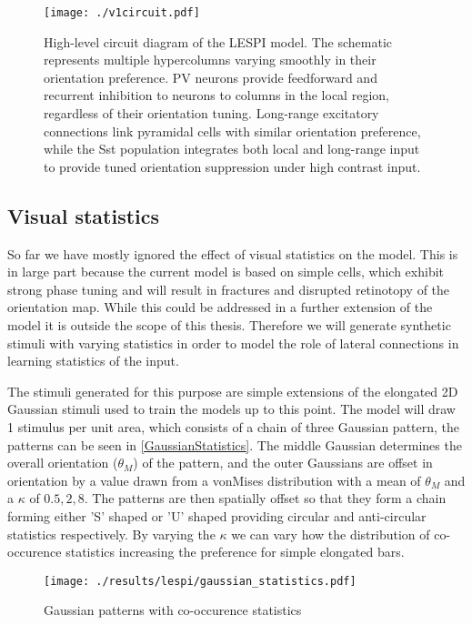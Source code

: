 \begin{figure}
	\centering
	\texttt{[image: ./v1circuit.pdf]}
	\caption[High-level circuit diagram of the LESPI
      model.]{High-level circuit diagram of the LESPI model. The
      schematic represents multiple hypercolumns varying smoothly in
      their orientation preference. PV neurons provide feedforward and
      recurrent inhibition to neurons to columns in the local region,
      regardless of their orientation tuning. Long-range excitatory
      connections link pyramidal cells with similar orientation
      preference, while the Sst population integrates both local and
      long-range input to provide tuned orientation suppression under
      high contrast input.}
    \label{circuit_diagram}
\end{figure}


\subsection{Visual statistics}

So far we have mostly ignored the effect of visual statistics on the
model. This is in large part because the current model is based on
simple cells, which exhibit strong phase tuning and will result in
fractures and disrupted retinotopy of the orientation map. While this
could be addressed in a further extension of the model it is outside
the scope of this thesis. Therefore we will generate synthetic stimuli
with varying statistics in order to model the role of lateral
connections in learning statistics of the input.

The stimuli generated for this purpose are simple extensions of the
elongated 2D Gaussian stimuli used to train the models up to this
point. The model will draw 1 stimulus per unit area, which consists of
a chain of three Gaussian pattern, the patterns can be seen in
\ref{GaussianStatistics}. The middle Gaussian determines the overall
orientation ($\theta_M$) of the pattern, and the outer Gaussians are
offset in orientation by a value drawn from a vonMises distribution
with a mean of $\theta_M$ and a $\kappa$ of ${0.5, 2, 8}$. The
patterns are then spatially offset so that they form a chain forming
either 'S' shaped or 'U' shaped providing circular and anti-circular
statistics respectively. By varying the $\kappa$ we can vary how the
distribution of co-occurence statistics increasing the preference for
simple elongated bars.

\begin{figure}
	\centering
	\texttt{[image: ./results/lespi/gaussian\_statistics.pdf]}
	\caption[Example of Gaussian patterns with co-occurence statistics]
            {Gaussian patterns with co-occurence statistics}
    \label{circuit_diagram}
\end{figure}

